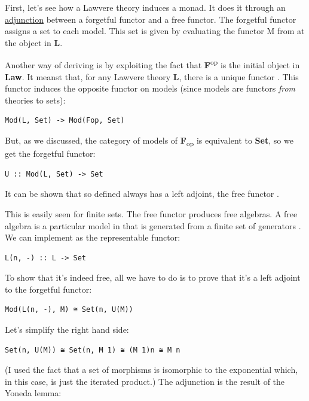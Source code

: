 First, let's see how a Lawvere theory induces a monad. It does it
through an
\href{https://bartoszmilewski.com/2016/06/15/freeforgetful-adjunctions/}{adjunction}
between a forgetful functor and a free functor. The forgetful functor
 assigns a set to each model. This set is given by evaluating
the functor M from  at the object  in
\textbf{L}.

Another way of deriving  is by exploiting the fact that
\textbf{F}\textsuperscript{op} is the initial object in \textbf{Law}. It
meanst that, for any Lawvere theory \textbf{L}, there is a unique
functor . This functor induces the
opposite functor on models (since models are functors \emph{from}
theories to sets):

\begin{verbatim}
Mod(L, Set) -> Mod(Fop, Set)
\end{verbatim}

But, as we discussed, the category of models of
\textbf{F}\textsubscript{op} is equivalent to \textbf{Set}, so we get
the forgetful functor:

\begin{verbatim}
U :: Mod(L, Set) -> Set
\end{verbatim}

It can be shown that so defined  always has a left adjoint,
the free functor .

This is easily seen for finite sets. The free functor 
produces free algebras. A free algebra is a particular model in
 that is generated from a finite set of generators
. We can implement  as the representable functor:

\begin{verbatim}
L(n, -) :: L -> Set
\end{verbatim}

To show that it's indeed free, all we have to do is to prove that it's a
left adjoint to the forgetful functor:

\begin{verbatim}
Mod(L(n, -), M) ≅ Set(n, U(M))
\end{verbatim}

Let's simplify the right hand side:

\begin{verbatim}
Set(n, U(M)) ≅ Set(n, M 1) ≅ (M 1)n ≅ M n
\end{verbatim}

(I used the fact that a set of morphisms is isomorphic to the
exponential which, in this case, is just the iterated product.) The
adjunction is the result of the Yoneda lemma:

